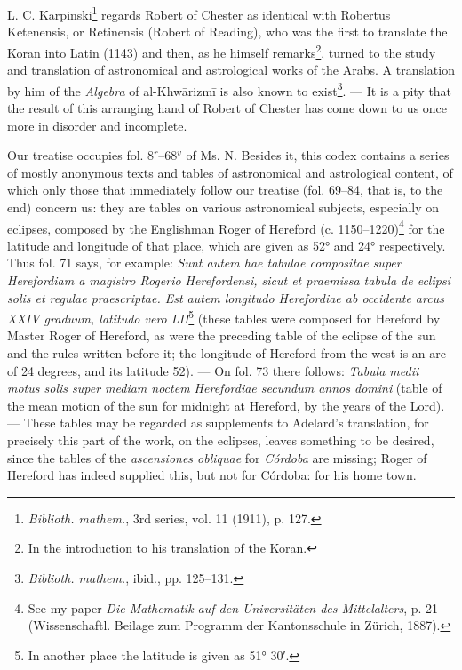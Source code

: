 \documentclass[11pt]{article}
\begin{document}
\par L. C. Karpinski\footnote{\emph{Biblioth. mathem.}, 3rd series, vol. 11 (1911), p. 127.} regards Robert of Chester as identical with Robertus Ketenensis, or Retinensis (Robert of Reading), who was the first to translate the Koran into Latin (1143) and then, as he himself remarks\footnote{In the introduction to his translation of the Koran.}, turned to the study and translation of astronomical and astrological works of the Arabs. A translation by him of the \emph{Algebra} of al-Khwārizmī is also known to exist\footnote{\emph{Biblioth. mathem.}, ibid., pp. 125–131.}. — It is a pity that the result of this arranging hand of Robert of Chester has come down to us once more in disorder and incomplete.\par
\par Our treatise occupies fol. 8$^{r}$–68$^{v}$ of Ms. N. Besides it, this codex contains a series of mostly anonymous texts and tables of astronomical and astrological content, of which only those that immediately follow our treatise (fol. 69–84, that is, to the end) concern us: they are tables on various astronomical subjects, especially on eclipses, composed by the Englishman Roger of Hereford (c. 1150–1220)\footnote{See my paper \emph{Die Mathematik auf den Universitäten des Mittelalters}, p. 21 (Wissenschaftl. Beilage zum Programm der Kantonsschule in Zürich, 1887).} for the latitude and longitude of that place, which are given as 52° and 24° respectively. Thus fol. 71 says, for example: \emph{Sunt autem hae tabulae compositae super Herefordiam a magistro Rogerio Herefordensi, sicut et praemissa tabula de eclipsi solis et regulae praescriptae. Est autem longitudo Herefordiae ab occidente arcus XXIV graduum, latitudo vero LII}\footnote{In another place the latitude is given as 51° 30′.} (these tables were composed for Hereford by Master Roger of Hereford, as were the preceding table of the eclipse of the sun and the rules written before it; the longitude of Hereford from the west is an arc of 24 degrees, and its latitude 52). — On fol. 73 there follows: \emph{Tabula medii motus solis super mediam noctem Herefordiae secundum annos domini} (table of the mean motion of the sun for midnight at Hereford, by the years of the Lord). — These tables may be regarded as supplements to Adelard's translation, for precisely this part of the work, on the eclipses, leaves something to be desired, since the tables of the \emph{ascensiones obliquae} for \emph{Córdoba} are missing; Roger of Hereford has indeed supplied this, but not for Córdoba: for his home town.\par
\end{document}
